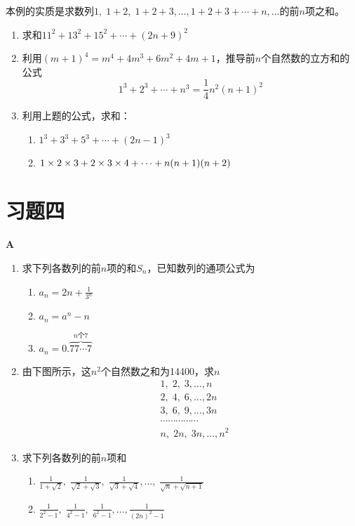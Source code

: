 \begin{rmk}
本例的实质是求数列$1,\; 1+2,\; 1+2+3,\ldots,1+2+3+\cdots +n,\ldots$的前$n$项之和。
\end{rmk}


\begin{ex}
\begin{enumerate}
    \item 求和$11^2+13^2+15^2+\cdots +(2n+9)^2$
    \item 利用$(m+1)^4=m^4+4m^3+6m^2+4m+1$，推导前$n$个自然数的立方和的公式
\[1^3+2^3+\cdots +n^3=\frac{1}{4}n^2(n+1)^2\]
\item 利用上题的公式，求和：
\begin{enumerate}[(1)]
    \item $1^3+3^3+5^3+\cdots +(2n-1)^3$
    \item $1\times 2\times 3+2\times 3\times 4+\cdots +n(n+1)(n+2)$
\end{enumerate}
\end{enumerate}
\end{ex}


\section*{习题四}
\begin{center}
    \bfseries A
\end{center}

\begin{enumerate}
    \item 求下列各数列的前$n$项的和$S_n$，已知数列的通项公式为
\begin{multicols}{2}
\begin{enumerate}[(1)]
    \item $a_n= 2n+\frac{1}{3^n}$
    \item $a_n= a^n-n$
    \item $a_n= 0.\overbrace{77\cdots 7}^{\text{$n$个7}}$
\end{enumerate}
\end{multicols}

\item 由下图所示，这$n^2$个自然数之和为14400，求$n$
\[\begin{split}
& 1,\; 2,\; 3,\ldots, n\\
&2,\; 4,\; 6,\ldots,2n\\
&3,\; 6,\; 9,\ldots,3n\\
&\cdots \cdots \cdots \cdots \cdots \\
&n,\; 2n,\; 3n,\ldots,n^2   
\end{split}\]

\item 求下列各数列的前$n$项和
\begin{enumerate}[(1)]
    \item $\frac{1}{1+\sqrt{2}},\; \frac{1}{\sqrt{2}+\sqrt{3}},\; \frac{1}{\sqrt{3}+\sqrt{4}},\ldots,\; \frac{1}{\sqrt{n}+\sqrt{n+1}}$
    \item $\frac{1}{2^2-1},\; \frac{1}{4^2-1},\; \frac{1}{6^2-1},\ldots, \frac{1}{(2n)^2-1}$
\end{enumerate}

\end{enumerate}

